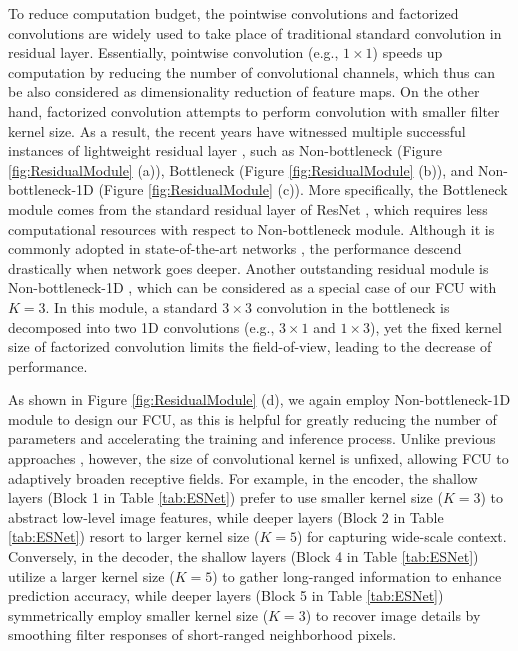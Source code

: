 \documentclass[runningheads]{llncs}
\begin{document}
To reduce computation budget, the pointwise convolutions \cite{Paszke2016enet,zhang2018shuffle,xie2017agg} and factorized convolutions \cite{Romera2018erfnet,fast2019zhang} are widely used to take place of traditional standard convolution in residual layer. Essentially, pointwise convolution (e.g., $1 \times 1$) speeds up computation by reducing the number of convolutional channels, which thus can be also considered as dimensionality reduction of feature maps. On the other hand, factorized convolution attempts to perform convolution with smaller filter kernel size. As a result, the recent years have witnessed multiple successful instances of lightweight residual layer \cite{Paszke2016enet,Howard2017mobile}, such as Non-bottleneck (Figure \ref{fig:ResidualModule} (a)), Bottleneck (Figure \ref{fig:ResidualModule} (b)), and Non-bottleneck-1D (Figure \ref{fig:ResidualModule} (c)). More specifically, the Bottleneck module comes from the standard residual layer of ResNet \cite{he2016deep}, which requires less computational resources with respect to Non-bottleneck module. Although it is commonly adopted in state-of-the-art networks \cite{Paszke2016enet,Mehta2018espnet,Howard2017mobile}, the performance descend drastically when network goes deeper. Another outstanding residual module is Non-bottleneck-1D \cite{Romera2018erfnet}, which can be considered as a special case of our FCU with $K = 3$. In this module, a standard $3 \times 3$ convolution in the bottleneck is decomposed into two 1D convolutions (e.g., $3 \times 1$ and $1 \times 3$), yet the fixed kernel size of factorized convolution limits the field-of-view, leading to the decrease of performance.

As shown in Figure \ref{fig:ResidualModule} (d), we again employ Non-bottleneck-1D module \cite{Romera2018erfnet,fast2019zhang} to design our FCU, as this is helpful for greatly reducing the number of parameters and accelerating the training and inference process. Unlike previous approaches \cite{Romera2018erfnet,fast2019zhang}, however, the size of convolutional kernel is unfixed, allowing FCU to adaptively broaden receptive fields. For example, in the encoder, the shallow layers (Block 1 in Table \ref{tab:ESNet}) prefer to use smaller kernel size ($K = 3$) to abstract low-level image features, while deeper layers (Block 2 in Table \ref{tab:ESNet}) resort to larger kernel size ($K = 5$) for capturing wide-scale context. Conversely, in the decoder, the shallow layers (Block 4 in Table \ref{tab:ESNet}) utilize a larger kernel size ($K = 5$) to gather long-ranged information to enhance prediction accuracy, while deeper layers (Block 5 in Table \ref{tab:ESNet}) symmetrically employ smaller kernel size ($K = 3$) to recover image details by smoothing filter responses of short-ranged neighborhood pixels.
\end{document}
